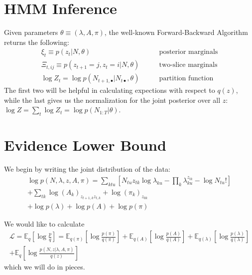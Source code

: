 \documentclass[11pt]{article}
\begin{document}
\section{HMM Inference}
Given parameters $\theta \equiv (\lambda, A, \pi)$, the well-known Forward-Backward Algorithm returns the following:
\begin{align}
    \xi_{t} \equiv p(z_{t}|N, \theta) \qquad &\text{posterior marginals}\\
    \Xi_{t, ij} \equiv p(z_{t+1} = j, z_{t} = i|N, \theta) \qquad &\text{two-slice marginals}\\
    \log Z_{t} = \log p(N_{t+1, \bullet}|N_{t\bullet}, \theta) \qquad &\text{partition function}
\end{align}
The first two will be helpful in calculating expections with respect to $q(z)$, while the last gives us the normalization for the joint posterior over all $z$: $\log Z = \sum_t \log Z_{t} = \log p(N_{1:T}|\theta)$. 

\section{Evidence Lower Bound}
We begin by writing the joint distribution of the data:
\begin{multline}
    \log p(N, \lambda, z, A,\pi) = \sum_{ktu}\left[ N_{tu} z_{tk} \log \lambda_{ku} - \prod_k \lambda_{ku}^{z_{tk}} - \log N_{tu}!\right] \\
    + \sum_{tk} \log (A_k)_{z_{t+1, k} z_{t, k}} + \log (\pi_k)_{z_{0k}} \\
    + \log p(\lambda) + \log p(A) + \log p(\pi) 
\end{multline}

We would like to calculate 
\begin{multline}
    \mathcal{L} = \mathbb{E}_q\left[\log \frac{p}{q}\right] = \mathbb{E}_{q(\pi)} \left[\log \frac{p(\pi)}{q(\pi)} \right] + \mathbb{E}_{q(A)} \left[\log \frac{p(A)}{q(A)} \right] + \mathbb{E}_{q(\lambda)} \left[\log \frac{p(\lambda)}{q(\lambda)} \right] \\ + \mathbb{E}_{q}\left[ \log \frac{p(N, z|\lambda, A, \pi)}{q(z)}\right] 
\end{multline}
which we will do in pieces. 
\end{document}
